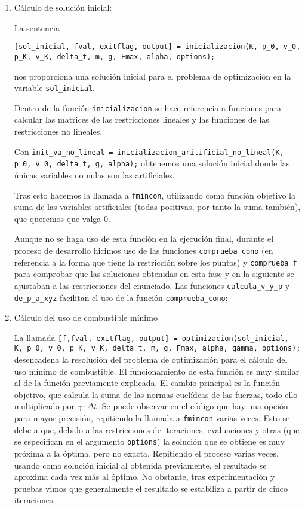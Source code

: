 \documentclass[10pt,a4paper]{article}
\begin{document}
\begin{enumerate}
\item Cálculo de solución inicial:

La sentencia

\texttt{[sol\_inicial, fval, exitflag, output] = inicializacion(K, p\_0, v\_0, p\_K, v\_K, delta\_t, m, g, Fmax, alpha, options);}

nos proporciona una solución inicial para el problema de optimización en la variable \texttt{sol\_inicial}. 

Dentro de la función \texttt{inicializacion} se hace referencia a funciones para calcular las matrices de las restricciones lineales y las funciones de las restricciones no lineales.

Con \texttt{init\_va\_no\_lineal = inicializacion\_aritificial\_no\_lineal(K, p\_0, v\_0, delta\_t, g, alpha);} obtenemos una solución inicial donde las únicas variables no nulas son las artificiales.

Tras esto hacemos la llamada a \texttt{fmincon}, utilizando como función objetivo la suma de las variables artificiales (todas positivas, por tanto la suma también), que queremos que valga 0.

Aunque no se haga uso de esta función en la ejecución final, durante el proceso de desarrollo hicimos uso de las funciones \texttt{comprueba\_cono} (en referencia a la forma que tiene la restricción sobre los puntos) y \texttt{comprueba\_f} para comprobar que las soluciones obtenidas en esta fase y en la siguiente se ajustaban a las restricciones del enunciado. Las funciones \texttt{calcula\_v\_y\_p} y \texttt{de\_p\_a\_xyz} facilitan el uso de la función \texttt{comprueba\_cono};

\item Cálculo del uso de combustible mínimo

La llamada \texttt{[f,fval, exitflag, output] = optimizacion(sol\_inicial, K, p\_0, v\_0, p\_K, v\_K, delta\_t, m, g, Fmax, alpha, gamma, options);}
desencadena la resolución del problema de optimización para el cálculo del uso mínimo de combustible. El funcionamiento de esta función es muy similar al de la función previamente explicada. El cambio principal es la función objetivo, que calcula la suma de las normas euclídeas de las fuerzas, todo ello multiplicado por $\gamma\cdot \Delta t$. Se puede observar en el código que hay una opción para mayor precisión, repitiendo la llamada a \texttt{fmincon} varias veces. Esto se debe a que, debido a las restricciones de iteraciones, evaluaciones y otras (que se especifican en el argumento \texttt{options}) la solución que se obtiene es muy próxima a la óptima, pero no exacta. Repitiendo el proceso varias veces, usando como solución inicial al obtenida previamente, el resultado se aproxima cada vez más al óptimo. No obstante, tras experimentación y pruebas vimos que generalmente el resultado se estabiliza a partir de cinco iteraciones. 


\end{enumerate}
\end{document}

